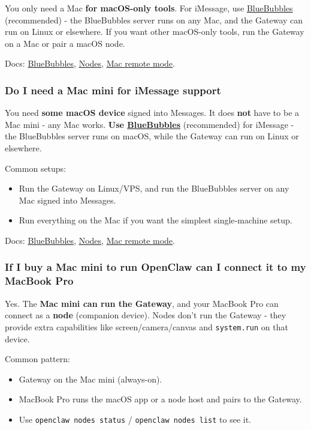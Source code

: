 You only need a Mac \textbf{for macOS-only tools}. For iMessage, use \href{/channels/bluebubbles}{BlueBubbles} (recommended) - the BlueBubbles server runs on any Mac, and the Gateway can run on Linux or elsewhere. If you want other macOS-only tools, run the Gateway on a Mac or pair a macOS node.

Docs: \href{/channels/bluebubbles}{BlueBubbles}, \href{/nodes}{Nodes}, \href{/platforms/mac/remote}{Mac remote mode}.

\subsubsection{Do I need a Mac mini for iMessage support}


You need \textbf{some macOS device} signed into Messages. It does \textbf{not} have to be a Mac mini -
any Mac works. \textbf{Use \href{/channels/bluebubbles}{BlueBubbles}} (recommended) for iMessage - the BlueBubbles server runs on macOS, while the Gateway can run on Linux or elsewhere.

Common setups:

\begin{itemize}
  \item Run the Gateway on Linux/VPS, and run the BlueBubbles server on any Mac signed into Messages.
  \item Run everything on the Mac if you want the simplest single‑machine setup.
\end{itemize}


Docs: \href{/channels/bluebubbles}{BlueBubbles}, \href{/nodes}{Nodes},
\href{/platforms/mac/remote}{Mac remote mode}.

\subsubsection{If I buy a Mac mini to run OpenClaw can I connect it to my MacBook Pro}


Yes. The \textbf{Mac mini can run the Gateway}, and your MacBook Pro can connect as a
\textbf{node} (companion device). Nodes don't run the Gateway - they provide extra
capabilities like screen/camera/canvas and \texttt{system.run} on that device.

Common pattern:

\begin{itemize}
  \item Gateway on the Mac mini (always-on).
  \item MacBook Pro runs the macOS app or a node host and pairs to the Gateway.
  \item Use \texttt{openclaw nodes status} / \texttt{openclaw nodes list} to see it.
\end{itemize}


